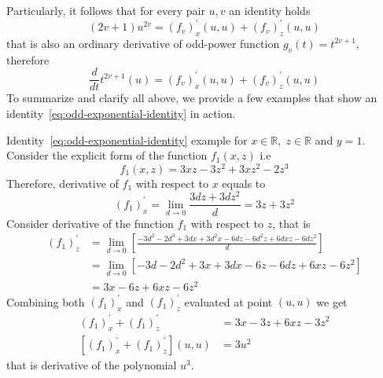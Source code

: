 Particularly, it follows that for every pair $u, v$ an identity holds
\begin{equation}
    \label{eq:equation}
    (2v+1)u^{2v} = (f_{v})^{'}_{x} (u, u) + (f_{v})^{'}_{z} (u, u)
\end{equation}
that is also an ordinary derivative of odd-power function $g_v(t) = t^{2v+1}$, therefore
\begin{equation*}
    \frac{d}{dt} t^{2v+1} (u) = (f_{v})^{'}_{x} (u, u) + (f_{v})^{'}_{z} (u, u)
\end{equation*}
To summarize and clarify all above, we provide a few examples that show an identity~\eqref{eq:odd-exponential-identity}
in action.
\begin{example}
    \normalfont
    Identity~\eqref{eq:odd-exponential-identity} example for $x\in\mathbb{R}, \; z\in \mathbb{R}$ and $y=1$.
    Consider the explicit form of the function $f_{1} (x, z)$ i.e
    \[
        f_1(x, z) = 3 x z - 3 z^2 + 3 x z^2 - 2 z^3
    \]
    Therefore, derivative of $f_{1}$ with respect to $x$ equals to
    \[
        (f_1)^{'}_{x} = \lim_{d \to 0} \frac{3 d z + 3 d z^2}{d} = 3 z + 3 z^2
    \]
    Consider derivative of the function $f_1$ with respect to $z$, that is
    \begin{align*}
    (f_1)
        ^{'}_{z}
        &= \lim_{d \to 0} \left[\frac{-3 d^2 - 2 d^3 + 3 d x + 3 d^2 x - 6 d z - 6 d^2 z + 6 d x z - 6 d z^2}{d} \right] \\
        &= \lim_{d \to 0} \left[ -3 d - 2 d^2 + 3 x + 3 d x - 6 z - 6 d z + 6 x z - 6 z^2 \right] \\
        &=3 x - 6 z + 6 x z - 6 z^2
    \end{align*}
    Combining both $(f_1)^{'}_{x}$ and $(f_1)^{'}_{z}$ evaluated at point $(u, u)$ we get
    \begin{align*}
    (f_1)
        ^{'}_{x} + (f_1)^{'}_{z}
        &= 3 x - 3 z + 6 x z - 3 z^2 \\
        [(f_1)^{'}_{x} + (f_1)^{'}_{z}] (u,u)  &= 3 u^2
    \end{align*}
    that is derivative of the polynomial $u^3$.
\end{example}
